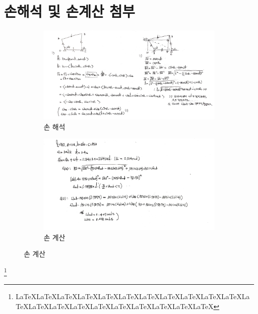 \documentclass{article}
\begin{document}
\section{손해석 및 손계산 첨부}
\begin{figure}[h]
 \begin{subfigure}{\textwidth}
  \centering
  \includegraphics[width=\linewidth]{hand1.jpg}  
  \caption{손 해석}
  \label{fig:sub-first}
 \end{subfigure}
 \begin{subfigure}{\textwidth}
  \centering
  \includegraphics[width=\linewidth]{hand2.jpg}  
  \caption{손 계산}
  \label{fig:sub-first}
 \end{subfigure}
 \end{figure}
 \footnote{\LaTeX{}\LaTeX{}\LaTeX{}\LaTeX{}\LaTeX{}\LaTeX{}\LaTeX{}\LaTeX{}\LaTeX{}\LaTeX{}\LaTeX{}\LaTeX{}\LaTeX{}\LaTeX{}\LaTeX{}\LaTeX{}\LaTeX{}\LaTeX{}\LaTeX{}\LaTeX{}\LaTeX{}}
\end{document}
